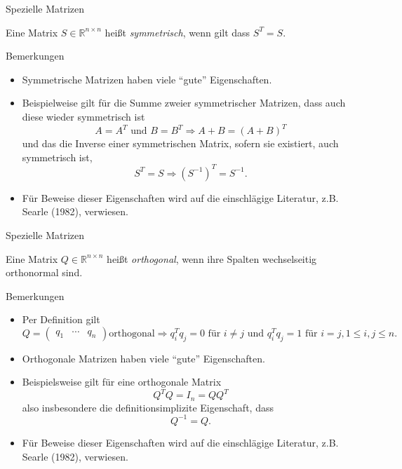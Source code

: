 \documentclass[
  8pt,
  ignorenonframetext,
]{beamer}
\providecommand{\tightlist}{%
  \setlength{\itemsep}{0pt}\setlength{\parskip}{0pt}}
\begin{document}
\begin{frame}{Spezielle Matrizen}
\protect\hypertarget{spezielle-matrizen-3}{}
\footnotesize
\begin{definition}
Eine Matrix $S \in \mathbb{R}^{n \times n}$ heißt \textit{symmetrisch}, wenn gilt dass $S^T = S$.
\end{definition}

Bemerkungen

\begin{itemize}
\tightlist
\item
  Symmetrische Matrizen haben viele ``gute'' Eigenschaften.
\item
  Beispielweise gilt für die Summe zweier symmetrischer Matrizen, dass
  auch diese wieder symmetrisch ist \begin{equation}
  A = A^T \mbox{ und } B = B^T \Rightarrow A + B = (A + B)^T
  \end{equation} und das die Inverse einer symmetrischen Matrix, sofern
  sie existiert, auch symmetrisch ist, \begin{equation}
  S^T = S \Rightarrow \left(S^{-1}\right)^T = S^{-1}.
  \end{equation}
\item
  Für Beweise dieser Eigenschaften wird auf die einschlägige Literatur,
  z.B. Searle (1982), verwiesen.
\end{itemize}
\end{frame}

\begin{frame}{Spezielle Matrizen}
\protect\hypertarget{spezielle-matrizen-4}{}
\footnotesize
\begin{definition}
Eine Matrix $Q \in \mathbb{R}^{n \times n}$ heißt \textit{orthogonal}, wenn ihre Spalten wechselseitig orthonormal sind.
\end{definition}

Bemerkungen

\begin{itemize}
\tightlist
\item
  Per Definition gilt \begin{equation*}
  Q = \begin{pmatrix} q_1 & \cdots & q_n \end{pmatrix} \mbox{orthogonal} \Rightarrow q_i^Tq_j = 0 \mbox{ für } i \neq j \mbox{ und }  q_i^Tq_j = 1 \mbox{ für } i = j, 1 \le i,j \le n.
  \end{equation*}
\item
  Orthogonale Matrizen haben viele ``gute'' Eigenschaften.
\item
  Beispielsweise gilt für eine orthogonale Matrix \begin{equation}
  Q^TQ = I_n = QQ^T
  \end{equation} also insbesondere die definitionsimplizite Eigenschaft,
  dass \begin{equation}
  Q^{-1} = Q.
  \end{equation}
\item
  Für Beweise dieser Eigenschaften wird auf die einschlägige Literatur,
  z.B. Searle (1982), verwiesen.
\end{itemize}
\end{frame}
\end{document}
